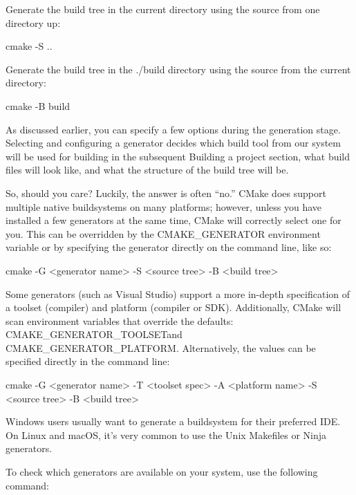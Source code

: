 
Generate the build tree in the current directory using the source from one directory up:

\begin{shell}
cmake -S ..
\end{shell}

Generate the build tree in the ./build directory using the source from the current directory:

\begin{shell}
cmake -B build
\end{shell}


As discussed earlier, you can specify a few options during the generation stage. Selecting and configuring a generator decides which build tool from our system will be used for building in the subsequent Building a project section, what build files will look like, and what the structure of the build tree will be.

So, should you care? Luckily, the answer is often “no.” CMake does support multiple native buildsystems on many platforms; however, unless you have installed a few generators at the same time, CMake will correctly select one for you. This can be overridden by the CMAKE\_GENERATOR environment variable or by specifying the generator directly on the command line, like so:

\begin{shell}
cmake -G <generator name> -S <source tree> -B <build tree>
\end{shell}

Some generators (such as Visual Studio) support a more in-depth specification of a toolset (compiler) and platform (compiler or SDK). Additionally, CMake will scan environment variables that override the defaults: CMAKE\_GENERATOR\_TOOLSETand CMAKE\_GENERATOR\_PLATFORM. Alternatively, the values can be specified directly in the command line:

\begin{shell}
cmake -G <generator name>
      -T <toolset spec>
      -A <platform name>
      -S <source tree> -B <build tree>
\end{shell}

Windows users usually want to generate a buildsystem for their preferred IDE. On Linux and macOS, it’s very common to use the Unix Makefiles or Ninja generators.

To check which generators are available on your system, use the following command:

